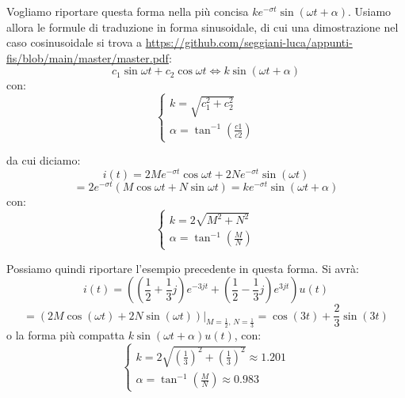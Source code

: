 \documentclass[a4paper,11pt]{article}
\begin{document}
Vogliamo riportare questa forma nella più concisa $ke^{-\sigma t} \sin(\omega t + \alpha)$. Usiamo allora le formule di traduzione in forma sinusoidale, di cui una dimostrazione nel caso cosinusoidale si trova a \url{https://github.com/seggiani-luca/appunti-fis/blob/main/master/master.pdf}:
\[
	c_1 \sin{\omega t} + c_2 \cos{\omega t}
	\Leftrightarrow
	k \sin(\omega t + \alpha)
\]
con:
\[
	\begin{cases}
		k = \sqrt{c_1^2 + c_2^2} \\ 
		\alpha = \tan^{-1}(\frac{c1}{c2})
	\end{cases}
\]

da cui diciamo:
$$
i(t) = 2 M e^{-\sigma t} \cos{\omega t} + 2 N e^{-\sigma t} \sin(\omega t)
$$
$$
= 2 e^{-\sigma t} \left( M \cos{\omega t} + N \sin{\omega t} \right)
= ke^{-\sigma t} \sin(\omega t + \alpha)
$$
con:
\[
	\begin{cases}
		k = 2\sqrt{M^2 + N^2} \\ 
		\alpha = \tan^{-1}\left(\frac{M}{N}\right)
	\end{cases}
\]

\par\smallskip 

Possiamo quindi riportare l'esempio precedente in questa forma.
Si avrà:
$$
i(t) = \left( \left( \frac{1}{2} + \frac{1}{3}j \right) e^{-3j t} + \left( \frac{1}{2} - \frac{1}{3}j \right) e^{3jt} \right) u(t)
$$
$$
= \left( 2M \cos(\omega t) + 2N \sin(\omega t) \right) \Big|_{M = \frac{1}{2}, \, N =\frac{1}{3}} = \cos(3t) + \frac{2}{3}\sin(3t)
$$
o la forma più compatta $k \sin(\omega t + \alpha)u(t)$, con:
\[
	\begin{cases}
		k = 2\sqrt{\left( \frac{1}{3} \right)^2 + \left( \frac{1}{3} \right)^2} \approx 1.201 \\ 
		\alpha = \tan^{-1} \left( \frac{M}{N} \right) \approx 0.983
	\end{cases}
\]
\end{document}
